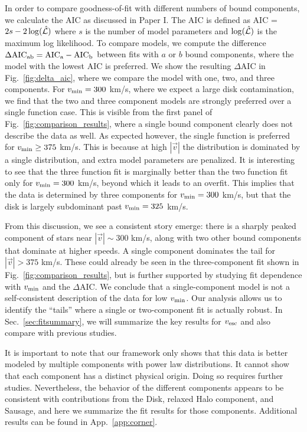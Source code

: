 \documentclass[twocolumn,preprintnumbers]{aastex63}
\DeclareRobustCommand{\Sec}[1]{Sec.~\ref{#1}}
\DeclareRobustCommand{\App}[1]{App.~\ref{#1}}
\DeclareRobustCommand{\Fig}[1]{Fig.~\ref{#1}}
\newcommand{\vesc}{v_{\rm esc}}
\newcommand{\vmin}{v_{\rm min}}
\newcommand{\speed}{|\vec{v}|}
\begin{document}
In order to compare goodness-of-fit with different numbers of bound components, we calculate the AIC \citep{aic} as discussed in Paper I. The AIC is defined as AIC = $2 s - 2 \log(\hat {\cal L})$ where $s$ is the number of model parameters and  $\log(\hat {\cal L})$ is the maximum log likelihood. To compare models, we compute the difference $\Delta \rm{AIC}_{ab} = \rm{AIC}_a - \rm{AIC}_b$ between fits with $a$ or $b$ bound components, where the model with the lowest AIC is preferred. We show the resulting $\Delta$AIC in \Fig{fig:delta_aic}, where we compare the model with one, two, and three components. For $\vmin = 300$ km/s, where we expect a large disk contamination, we find that the two and three component models are strongly preferred over a single function case. This is visible from the first panel of \Fig{fig:comparison_results}, where a single bound component clearly does not describe the data as well. As expected however, the single function is preferred for $\vmin \ge 375$ km/s. This is because at high $\speed$ the distribution is dominated by a single distribution, and extra model parameters are penalized. It is interesting to see that the three function fit is marginally better than the two function fit only for $\vmin = 300$ km/s, beyond which it leads to an overfit. This implies that the data is determined by three components for $\vmin = 300$ km/s, but that the disk is largely subdominant past $\vmin = 325$ km/s. 


From this discussion, we see a consistent story emerge: there is a sharply peaked component of stars near $\speed \sim 300$ km/s, along with two other bound components that dominate at higher speeds.  A single component dominates the tail for $\speed > 375$ km/s. These could already be seen in the three-component fit shown in \Fig{fig:comparison_results}, but is further supported by studying fit dependence with $\vmin$ and the $\Delta$AIC. We conclude that a single-component model is not a self-consistent description of the data for low $\vmin$. 
Our analysis allows us to identify the ``tails'' where a single or two-component fit is actually robust. In \Sec{sec:fitsummary}, we will summarize the key results for $\vesc$ and also compare with previous studies. 

It is important to note that our framework only shows that this data is better modeled by multiple components with power law distributions. It cannot show that each component has a distinct physical origin. Doing so requires further studies. Nevertheless, the behavior of the different components appears to be consistent with contributions from the Disk, relaxed Halo component, and Sausage, and here we summarize the fit results for those components. Additional results can be found in \App{app:corner}.
\end{document}
